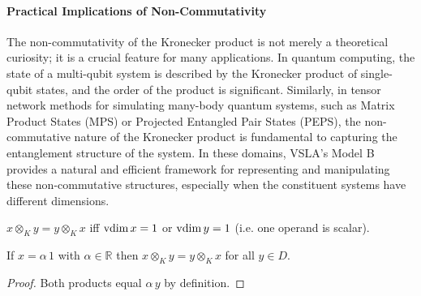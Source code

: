 \paragraph{Practical Implications of Non-Commutativity}
The non-commutativity of the Kronecker product is not merely a theoretical curiosity; it is a crucial feature for many applications. In quantum computing, the state of a multi-qubit system is described by the Kronecker product of single-qubit states, and the order of the product is significant. Similarly, in tensor network methods for simulating many-body quantum systems, such as Matrix Product States (MPS) or Projected Entangled Pair States (PEPS), the non-commutative nature of the Kronecker product is fundamental to capturing the entanglement structure of the system. In these domains, VSLA's Model B provides a natural and efficient framework for representing and manipulating these non-commutative structures, especially when the constituent systems have different dimensions.

\begin{proposition}\label{prop:commCase}
$x\otimes_K y = y\otimes_K x$ iff $\operatorname{vdim} x =1$ or $\operatorname{vdim} y =1$ (i.e. one operand is scalar).
\end{proposition}

\begin{lemma}\label{lem:scalarComm}
If $x=\alpha\,1$ with $\alpha\in\mathbb R$ then $x\otimes_K y = y\otimes_K x$ for all $y\in D$.
\end{lemma}
\begin{proof}
Both products equal $\alpha\,y$ by definition.\end{proof}
